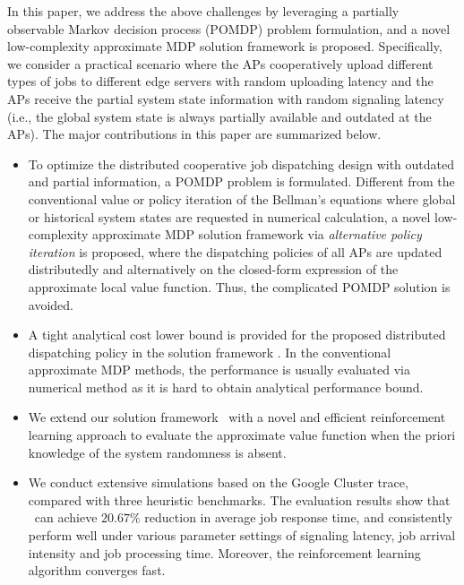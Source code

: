 In this paper, we address the above challenges by leveraging a partially observable Markov decision process (POMDP) problem formulation, and a novel low-complexity approximate MDP solution framework is proposed.
Specifically, we consider a practical scenario where the APs cooperatively upload different types of jobs to different edge servers with random uploading latency and the APs receive the partial system state information with random signaling latency (i.e., the global system state is always partially available and outdated at the APs).
The major contributions in this paper are summarized below.
\begin{itemize}
    \item To optimize the distributed cooperative job dispatching design with outdated and partial information, a POMDP problem is formulated.
    Different from the conventional value or policy iteration of the Bellman's equations where global or historical system states are requested in numerical calculation, a novel low-complexity approximate MDP solution framework via \emph{alternative policy iteration} is proposed, where the dispatching policies of all APs are updated distributedly and alternatively on the {closed-form expression} of the approximate local value function.
    Thus, the complicated POMDP solution is avoided.
    \item A tight analytical cost lower bound is provided for the proposed distributed dispatching policy in the solution framework \algname. In the conventional approximate MDP methods, the performance is usually evaluated via numerical method as it is hard to obtain analytical performance bound.
    \item We extend our solution framework \algname~with a novel and efficient reinforcement learning approach to evaluate the approximate value function when the priori knowledge of the system randomness is absent.
    \item We conduct extensive simulations based on the Google Cluster trace, compared with three heuristic benchmarks. The evaluation results show that \algname~can achieve $20.67\%$ reduction in average job response time, and consistently perform well under various parameter settings of signaling latency, job arrival intensity and job processing time. {Moreover, the reinforcement learning algorithm converges fast.}
\end{itemize}

